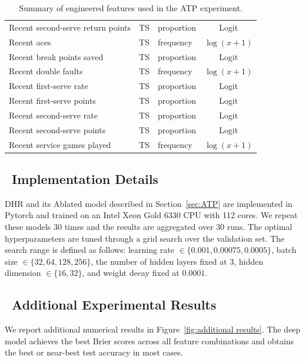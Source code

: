 \documentclass[
  12pt]{article}
\begin{document}
\begin{table}[t]
\begin{tabular}{lllc}
Recent second-serve return points & TS & proportion   & Logit       \\
Recent aces                       & TS & frequency    & $\log(x+1)$ \\
Recent break points saved         & TS & proportion   & Logit       \\
Recent double faults              & TS & frequency    & $\log(x+1)$ \\
Recent first-serve rate           & TS & proportion   & Logit       \\
Recent first-serve points         & TS & proportion   & Logit       \\
Recent second-serve rate          & TS & proportion   & Logit       \\
Recent second-serve points        & TS & proportion   & Logit       \\
Recent service games played       & TS & frequency    & $\log(x+1)$ \\
\bottomrule
\end{tabular}
\caption{Summary of engineered features used in the ATP experiment.}
\label{tab:atp_features}
\end{table}




\subsection{~Implementation Details}
DHR and its Ablated model described in Section~\ref{sec:ATP} are implemented in Pytorch and trained on an Intel Xeon Gold 6330 CPU with 112 cores.  We repeat these models 30 times and the results are aggregated over 30 runs. The optimal hyperparameters are tuned through a grid search 
over the validation set. The search range is defined as follows: learning 
rate $\in \{0.001, 0.00075, 0.0005\}$, batch size $\in \{32, 64, 128, 256\}$, 
the number of hidden layers fixed at $3$, hidden dimension $\in \{16, 32\}$, 
and weight decay fixed at $0.0001$.

\subsection{~Additional Experimental Results}\label{appendix: anr}
We report additional numerical results in Figure~\ref{fig:additional results}. The deep model achieves the best Brier scores across all feature combinations and obtains the best or near-best test accuracy in most cases.
\end{document}

